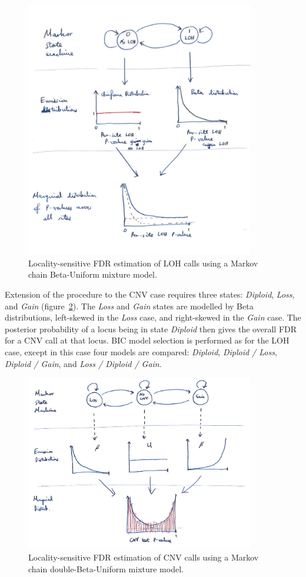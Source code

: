 \documentclass[thesis.tex]{subfiles}
\begin{document}
\begin{figure}
\centering
\includegraphics[width=100mm]{resources/comp_loh_hmm.jpg}
\caption{Locality-sensitive FDR estimation of LOH calls using a Markov chain Beta-Uniform mixture model.\label{fig:comp_loh_hmm}}
\end{figure}

Extension of the procedure to the \gls{CNV} case requires three states: \emph{Diploid}, \emph{Loss}, and \emph{Gain} (figure~\ref{fig:comp_cnv_hmm}).  The \emph{Loss} and \emph{Gain} states are modelled by Beta distributions, left-skewed in the \emph{Loss} case, and right-skewed in the \emph{Gain} case.  The posterior probability of a locus being in state \emph{Diploid} then gives the overall \gls{FDR} for a \gls{CNV} call at that locus.  \Gls{BIC} model selection is performed as for the \gls{LOH} case, except in this case four models are compared: \emph{Diploid}, \emph{Diploid / Loss}, \emph{Diploid / Gain}, and \emph{Loss / Diploid / Gain}.

\begin{figure}
\centering
\includegraphics[width=100mm]{resources/comp_cnv_hmm.jpg}
\caption{Locality-sensitive FDR estimation of CNV calls using a Markov chain double-Beta-Uniform mixture model.\label{fig:comp_cnv_hmm}}
\end{figure}
\end{document}
